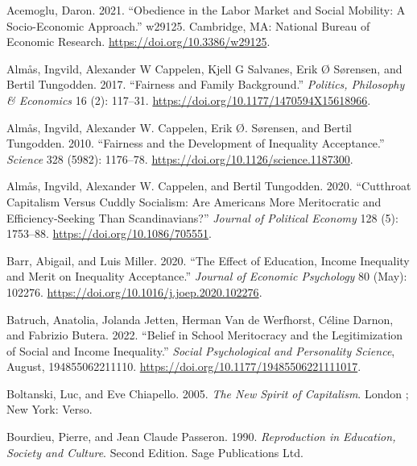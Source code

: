 \documentclass[
  letterpaper,
  DIV=11,
  numbers=noendperiod]{scrartcl}
\newlength{\cslhangindent}
\newlength{\cslentryspacingunit} %
\newenvironment{CSLReferences}[2] %
 {%
  \setlength{\parindent}{0pt}
  \ifodd #1
  \let\oldpar\par
  \def\par{\hangindent=\cslhangindent\oldpar}
  \fi
  \setlength{\parskip}{#2\cslentryspacingunit}
 }%
 {}
\begin{document}
\hypertarget{refs}{}
\begin{CSLReferences}{1}{0}
\leavevmode{}%
Acemoglu, Daron. 2021. {``Obedience in the {Labor Market} and {Social
Mobility}: {A Socio-Economic Approach}.''} w29125. Cambridge, MA:
National Bureau of Economic Research.
\url{https://doi.org/10.3386/w29125}.

\leavevmode{}%
Almås, Ingvild, Alexander W Cappelen, Kjell G Salvanes, Erik Ø Sørensen,
and Bertil Tungodden. 2017. {``Fairness and Family Background.''}
\emph{Politics, Philosophy \& Economics} 16 (2): 117--31.
\url{https://doi.org/10.1177/1470594X15618966}.

\leavevmode{}%
Almås, Ingvild, Alexander W. Cappelen, Erik Ø. Sørensen, and Bertil
Tungodden. 2010. {``Fairness and the {Development} of {Inequality
Acceptance}.''} \emph{Science} 328 (5982): 1176--78.
\url{https://doi.org/10.1126/science.1187300}.

\leavevmode{}%
Almås, Ingvild, Alexander W. Cappelen, and Bertil Tungodden. 2020.
{``Cutthroat {Capitalism} Versus {Cuddly Socialism}: {Are Americans More
Meritocratic} and {Efficiency-Seeking} Than {Scandinavians}?''}
\emph{Journal of Political Economy} 128 (5): 1753--88.
\url{https://doi.org/10.1086/705551}.

\leavevmode{}%
Barr, Abigail, and Luis Miller. 2020. {``The Effect of Education, Income
Inequality and Merit on Inequality Acceptance.''} \emph{Journal of
Economic Psychology} 80 (May): 102276.
\url{https://doi.org/10.1016/j.joep.2020.102276}.

\leavevmode{}%
Batruch, Anatolia, Jolanda Jetten, Herman Van de Werfhorst, Céline
Darnon, and Fabrizio Butera. 2022. {``Belief in {School Meritocracy} and
the {Legitimization} of {Social} and {Income Inequality}.''}
\emph{Social Psychological and Personality Science}, August,
194855062211110. \url{https://doi.org/10.1177/19485506221111017}.

\leavevmode{}%
Boltanski, Luc, and Eve Chiapello. 2005. \emph{The New Spirit of
Capitalism}. London ; New York: Verso.

\leavevmode{}%
Bourdieu, Pierre, and Jean Claude Passeron. 1990. \emph{Reproduction in
{Education}, {Society} and {Culture}}. Second Edition. Sage Publications
Ltd.


\end{CSLReferences}
\end{document}
